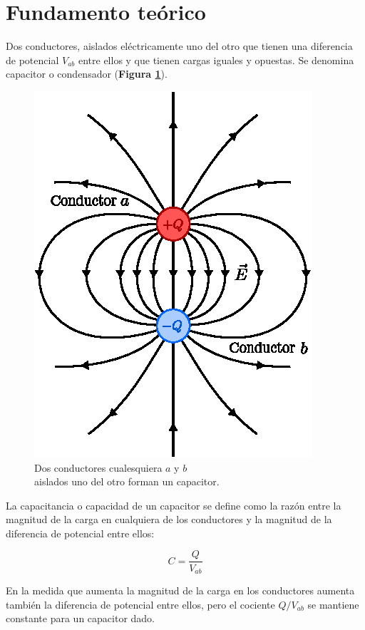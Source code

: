 \documentclass[letter,11pt]{article}
\begin{document}
\section{Fundamento teórico}

Dos conductores, aislados eléctricamente uno del otro que tienen una diferencia
de potencial $V_{ab}$ entre ellos y que tienen cargas iguales y opuestas. Se
denomina capacitor o condensador (\textbf{Figura \ref{figura1}}).

\begin{figure}[!h]
\centering
\includegraphics[scale=1.00]{resources/f1.eps}
\caption{Dos conductores cualesquiera $a$ y $b$ \\ aislados uno del otro forman
un capacitor.}
\label{figura1}
\end{figure}

La capacitancia o capacidad de un capacitor se define como la razón entre la
magnitud de la carga en cualquiera de los conductores y la magnitud de la
diferencia de potencial entre ellos:

\begin{equation}
    C = \frac{Q}{V_{ab}}
\label{capacitancia}
\end{equation}

En la medida que aumenta la magnitud de la carga en los conductores aumenta
también la diferencia de potencial entre ellos, pero el cociente $Q/V_{ab}$ se
mantiene constante para un capacitor dado.
\end{document}
